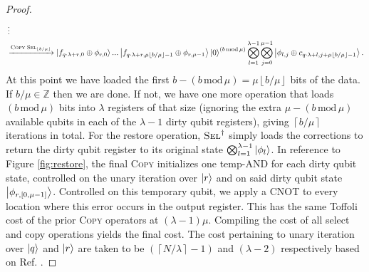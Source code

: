 \documentclass[a4paper, amsfonts, amssymb, amsmath, reprint, showkeys, twoside,superscriptaddress, onecolumn, nofootinbib]{revtex4-2}
\newcommand{\ceil}[1]{\left\lceil #1 \right\rceil}
\newcommand{\floor}[1]{\left\lfloor #1 \right\rfloor}
\begin{document}
\begin{proof}
\begin{align}
    & \vdots \notag \\
    &\xrightarrow[]{ \textsc{Copy} \;\textsc{Sel}_{\floor{b/\mu}}} \ket{f_{q\cdot \lambda +r,0} \oplus \phi_{r,0}}...\ket{f_{q\cdot \lambda +r,\mu \floor{b/\mu} -1}\oplus \phi_{r,\mu-1}} \ket{0}^{(b \, \mathrm{mod} \, \mu)} \bigotimes_{l=1}^{\lambda-1} \bigotimes_{j=0}^{\mu-1} \ket{\phi_{l,j} \oplus c_{q\cdot \lambda +l,j+\mu\floor{b/\mu}-1}}.
\end{align}
At this point we have loaded the first $b- (b \, \mathrm{mod} \, \mu) = \mu \floor{b/\mu}$ bits of the data. If $b/\mu \in \mathbb{Z}$ then we are done. If not, we have one more operation that loads $(b \, \mathrm{mod} \, \mu)$ bits into $\lambda$ registers of that size (ignoring the extra $\mu - (b \, \mathrm{mod} \, \mu)$ available qubits in each of the $\lambda-1$ dirty qubit registers), giving $\ceil{b/\mu}$ iterations in total. For the restore operation, $\textsc{Sel}^\dagger$ simply loads the corrections to return the dirty qubit register to its original state $\bigotimes_{l=1}^{\lambda-1}\ket{\phi_l}$. In reference to Figure \ref{fig:restore}, the final \textsc{Copy} initializes one temp-AND for each dirty qubit state, controlled on the unary iteration over $\ket r$ and on said dirty qubit state $\ket{\phi_{r,[0, \mu-1]}}$. Controlled on this temporary qubit, we apply a CNOT to every location where this error occurs in the output register. This has the same Toffoli cost of the prior \textsc{Copy} operators at $(\lambda-1)\mu$. Compiling the cost of all select and copy operations yields the final cost. The cost pertaining to unary iteration over $\ket q$ and $\ket r$ are taken to be $(\ceil{N/\lambda}-1)$ and $(\lambda-2)$ respectively based on Ref. \cite{babbush2018encoding}.  
\end{proof}
\end{document}

